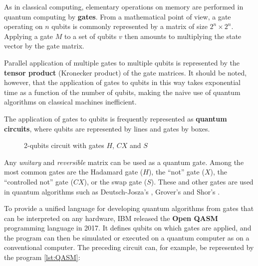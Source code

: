 \vspace{1em}

As in classical computing, elementary operations on memory are performed in quantum computing by \textbf{gates}. From a mathematical point of view, a gate operating on $n$ qubits is commonly represented by a matrix of size $2^n \times 2^n$. Applying a gate $M$ to a set of qubits $v$ then amounts to multiplying the state vector by the gate matrix.

Parallel application of multiple gates to multiple qubits is represented by the \textbf{tensor product} (Kronecker product) of the gate matrices. It should be noted, however, that the application of gates to qubits in this way takes exponential time as a function of the number of qubits, making the naive use of quantum algorithms on classical machines inefficient.

The application of gates to qubits is frequently represented as \textbf{quantum circuits}, where qubits are represented by lines and gates by boxes.

\begin{figure}
  \centering
  \caption{2-qubits circuit with gates $H$, $CX$ and $S$}
\end{figure}

Any \textit{unitary} and \textit{reversible} matrix can be used as a quantum gate. Among the most common gates are the Hadamard gate ($H$), the “not” gate ($X$), the “controlled not” gate ($CX$), or the swap gate ($S$). These and other gates are used in quantum algorithms such as Deutsch-Josza's \cite{DJ_1992}, Grover's \cite{Grover_1996} and Shor's \cite{Shor_1997}.

\vspace{1em}

To provide a unified language for developing quantum algorithms from gates that can be interpreted on any hardware, IBM released the \textbf{Open QASM} programming language in 2017. \cite{QASM_2017} It defines qubits on which gates are applied, and the program can then be simulated or executed on a quantum computer as on a conventional computer. The preceding circuit can, for example, be represented by the program \ref{lst:QASM}:

